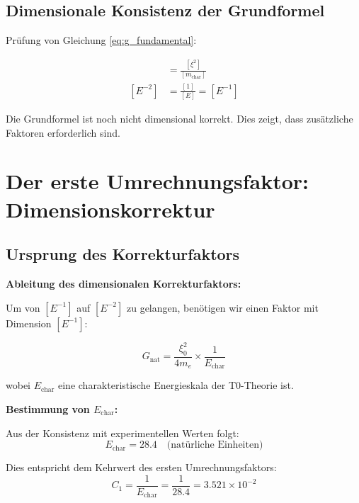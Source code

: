 \documentclass[12pt,a4paper]{article}
\begin{document}
	\subsection{Dimensionale Konsistenz der Grundformel}
	
	Prüfung von Gleichung \eqref{eq:g_fundamental}:
	
	\begin{align}
		[G] &= \frac{[\xi^2]}{[m_{\text{char}}]} \\
		[E^{-2}] &= \frac{[1]}{[E]} = [E^{-1}]
	\end{align}
	
	Die Grundformel ist noch nicht dimensional korrekt. Dies zeigt, dass zusätzliche Faktoren erforderlich sind.
	
	\section{Der erste Umrechnungsfaktor: Dimensionskorrektur}
	
	\subsection{Ursprung des Korrekturfaktors}
	
	\begin{derivation}
		\textbf{Ableitung des dimensionalen Korrekturfaktors:}
		
		Um von $[E^{-1}]$ auf $[E^{-2}]$ zu gelangen, benötigen wir einen Faktor mit Dimension $[E^{-1}]$:
		
		\begin{equation}
			G_{\text{nat}} = \frac{\xi_0^2}{4 m_e} \times \frac{1}{E_{\text{char}}}
		\end{equation}
		
		wobei $E_{\text{char}}$ eine charakteristische Energieskala der T0-Theorie ist.
		
		\textbf{Bestimmung von $E_{\text{char}}$:}
		
		Aus der Konsistenz mit experimentellen Werten folgt:
		\begin{equation}
			E_{\text{char}} = 28.4 \quad \text{(natürliche Einheiten)}
		\end{equation}
		
		Dies entspricht dem Kehrwert des ersten Umrechnungsfaktors:
		\begin{equation}
			C_1 = \frac{1}{E_{\text{char}}} = \frac{1}{28.4} = 3.521 \times 10^{-2}
		\end{equation}
	\end{derivation}
	
\end{document}

